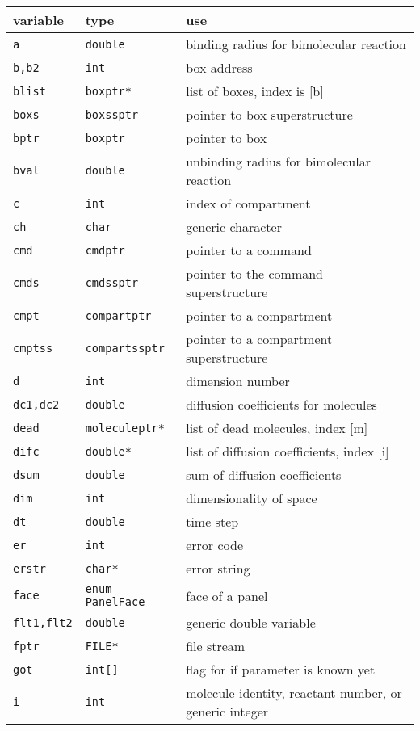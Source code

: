 \documentclass {scrbook}
\newcommand {\ttt} {\texttt}
\begin{document}
\begin{longtable}[c]{lll}
variable & type & use\\
\hline
\ttt{a} & \ttt{double} & binding radius for bimolecular reaction\\
\ttt{b,b2} & \ttt{int} & box address\\
\ttt{blist} & \ttt{boxptr*} & list of boxes, index is [b]\\
\ttt{boxs} & \ttt{boxssptr} & pointer to box superstructure\\
\ttt{bptr} & \ttt{boxptr} & pointer to box\\
\ttt{bval} & \ttt{double} & unbinding radius for bimolecular reaction\\
\ttt{c} & \ttt{int} & index of compartment\\
\ttt{ch} & \ttt{char} & generic character\\
\ttt{cmd} & \ttt{cmdptr} & pointer to a command\\
\ttt{cmds} & \ttt{cmdssptr} & pointer to the command superstructure\\
\ttt{cmpt} & \ttt{compartptr} & pointer to a compartment\\
\ttt{cmptss} & \ttt{compartssptr} & pointer to a compartment superstructure\\
\ttt{d} & \ttt{int} & dimension number\\
\ttt{dc1,dc2} & \ttt{double} & diffusion coefficients for molecules\\
\ttt{dead} & \ttt{moleculeptr*} & list of dead molecules, index [m]\\
\ttt{difc} & \ttt{double*} & list of diffusion coefficients, index [i]\\
\ttt{dsum} & \ttt{double} & sum of diffusion coefficients\\
\ttt{dim} & \ttt{int} & dimensionality of space\\
\ttt{dt} & \ttt{double} & time step\\
\ttt{er} & \ttt{int} & error code\\
\ttt{erstr} & \ttt{char*} & error string\\
\ttt{face} & \ttt{enum PanelFace} & face of a panel\\
\ttt{flt1,flt2} & \ttt{double} & generic double variable\\
\ttt{fptr} & \ttt{FILE*} & file stream\\
\ttt{got} & \ttt{int[]} & flag for if parameter is known yet\\
\ttt{i} & \ttt{int} & molecule identity, reactant number, or generic integer\\

\end{longtable}
\end{document}
